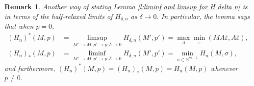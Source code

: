 \documentclass[reqno]{amsart}
\newtheorem{remark}[theorem]{Remark}
\numberwithin{equation}{section}
\begin{document}
\begin{remark}\label{r:half relaxed limits H n delta}
  Another way of stating Lemma \ref{l:liminf and limsup for H delta n} is in terms of the half-relaxed limits of $H_{\delta,n}$ as $\delta \to 0$. In particular, the lemma says that when $p =0$,
  \begin{align*}
    (H_n)^*(M,p) & = \limsup_{M'\to M, p'\to p,\delta \to 0} H_{\delta,n}(M',p') = \max_A \min_{\overline \varepsilon}(MA\overline\varepsilon,A\overline\varepsilon),\\
    (H_n)_*(M,p) & = \liminf_{M'\to M, p'\to p,\delta \to 0} H_{\delta,n}(M',p') = \min_{\sigma \in \mathbb{S}^{m-1}} H_n(M,\sigma), 
  \end{align*}
  and furthermore, $(H_n)^*(M,p) = (H_n)_*(M,p) = H_n(M,p)$ whenever $p \neq 0$. 

\end{remark}
\end{document}
